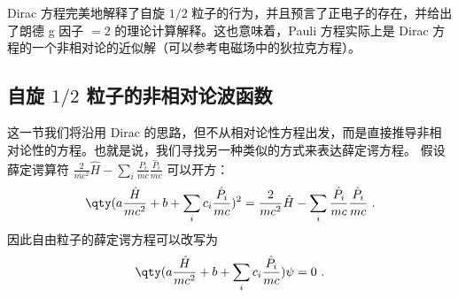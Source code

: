 Dirac 方程完美地解释了自旋 $1/2$ 粒子的行为，并且预言了正电子的存在，并给出了朗德 g 因子 $=2$ 的理论计算解释。这也意味着，Pauli 方程实际上是 Dirac 方程的一个非相对论的近似解（可以参考电磁场中的狄拉克方程）。

\subsection{自旋 $1/2$ 粒子的非相对论波函数}
这一节我们将沿用 Dirac 的思路，但不从相对论性方程出发，而是直接推导非相对论性的方程。也就是说，我们寻找另一种类似的方式来表达薛定谔方程。
假设薛定谔算符 $\frac{2}{mc^2} \hat H-\sum_i\frac{P_i}{mc}\frac{\hat P_i}{mc}$ 可以开方：
\begin{equation}
\qty(a\frac{\hat H}{mc^2}+b+\sum_ic_i \frac{\hat P_i}{mc})^2=\frac{2}{mc^2} \hat H-\sum_i\frac{\hat P_i}{mc}\frac{\hat P_i}{mc}~.
\end{equation}
因此自由粒子的薛定谔方程可以改写为
\begin{equation}\label{eq_scheq2_2}
\qty(a\frac{\hat H}{mc^2}+b+\sum_ic_i \frac{\hat P_i}{mc})\psi=0~.
\end{equation}

